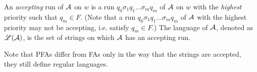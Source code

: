 An \emph{accepting} run of $\mathcal{A}$ on $w$ is a run $q_0 \sigma_1 q_1 \ldots \sigma_m q_m$ of $\mathcal{A}$ on $w$ with the \emph{highest} priority such that $q_m \in F$. (Note that a run $q_0 \sigma_1 q_1 \ldots \sigma_m q_m$ of $\mathcal{A}$ with the highest priority may not be accepting, i.e. satisfy $q_m \in F$.) The language of $\mathcal{A}$, denoted as $\mathscr{L}(\mathcal{A})$, is the set of strings on which $\mathcal{A}$ has an accepting run.


Note that PFAs differ from FAs only in the way that the strings are accepted, they still define regular languages. 


